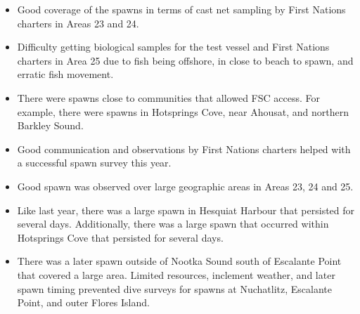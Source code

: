 \begin{itemize}

\item Good coverage of the spawns in terms of
cast net sampling by First Nations charters in Areas 23 and 24.

\item Difficulty getting biological samples for the test vessel
and First Nations charters in Area 25 due to
fish being offshore, in close to beach to spawn, and erratic fish movement.

\item There were spawns close to communities that allowed FSC access.
For example, there were spawns in
Hotsprings Cove, near Ahousat, and northern Barkley Sound.

\item Good communication and observations by
First Nations charters helped with a successful spawn survey this year.

\item Good spawn was observed over large geographic areas in Areas 23, 24 and 25.

\item Like last year, there was a large spawn in Hesquiat Harbour
that persisted for several days.
Additionally, there was a large spawn that occurred within Hotsprings Cove
that persisted for several days.

\item There was a later spawn outside of Nootka Sound
south of Escalante Point that covered a large area.
Limited resources, inclement weather, and later spawn timing
prevented dive surveys for spawns at
Nuchatlitz, Escalante Point, and outer Flores Island.

\end{itemize}